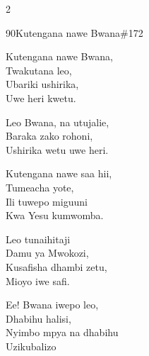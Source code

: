 \documentclass{article}
\begin{document}
\begin{multicols}{2}
\begin{hymn}{90}{Kutengana nawe Bwana}{\#172}
\begin{stanza}
Kutengana nawe Bwana,\\
Twakutana leo,\\
Ubariki ushirika,\\
Uwe heri kwetu.
\end{stanza}
\begin{chorus}
Leo Bwana, na utujalie,\\
Baraka zako rohoni,\\
Ushirika wetu uwe heri.
\end{chorus}
\begin{stanza}
Kutengana nawe saa hii,\\
Tumeacha yote,\\
Ili tuwepo miguuni\\
Kwa Yesu kumwomba.
\end{stanza}
\begin{stanza}
Leo tunaihitaji\\
Damu ya Mwokozi,\\
Kusafisha dhambi zetu,\\
Mioyo iwe safi.
\end{stanza}
\begin{stanza}
Ee! Bwana iwepo leo,\\
Dhabihu halisi,\\
Nyimbo mpya na dhabihu\\
Uzikubalizo
\end{stanza}
\end{hymn}


\end{multicols}
\end{document}
